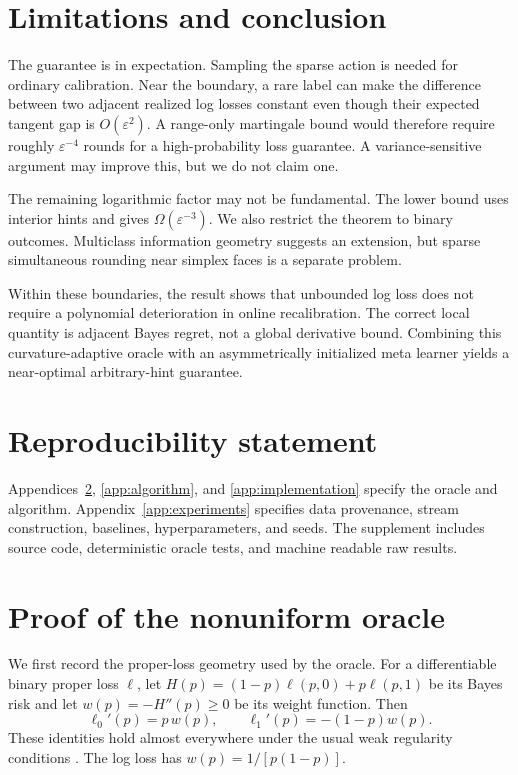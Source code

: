 \documentclass{article}
\begin{document}
\section{Limitations and conclusion}
\label{sec:conclusion}

The guarantee is in expectation. Sampling the sparse action is needed for ordinary calibration. Near the boundary, a rare label can make the difference between two adjacent realized log losses constant even though their expected tangent gap is $O(\varepsilon^2)$. A range-only martingale bound would therefore require roughly $\varepsilon^{-4}$ rounds for a high-probability loss guarantee. A variance-sensitive argument may improve this, but we do not claim one.

The remaining logarithmic factor may not be fundamental. The lower bound uses interior hints and gives $\Omega(\varepsilon^{-3})$. We also restrict the theorem to binary outcomes. Multiclass information geometry suggests an extension, but sparse simultaneous rounding near simplex faces is a separate problem.

Within these boundaries, the result shows that unbounded log loss does not require a polynomial deterioration in online recalibration. The correct local quantity is adjacent Bayes regret, not a global derivative bound. Combining this curvature-adaptive oracle with an asymmetrically initialized meta learner yields a near-optimal arbitrary-hint guarantee.

\section*{Reproducibility statement}

Appendices~\ref{app:oracle-proof}, \ref{app:algorithm}, and \ref{app:implementation} specify the oracle and algorithm. Appendix~\ref{app:experiments} specifies data provenance, stream construction, baselines, hyperparameters, and seeds. The supplement includes source code, deterministic oracle tests, and machine readable raw results.




\appendix

\section{Proof of the nonuniform oracle}
\label{app:oracle-proof}

We first record the proper-loss geometry used by the oracle. For a differentiable binary proper loss $\ell$, let $H(p)=(1-p)\ell(p,0)+p\ell(p,1)$ be its Bayes risk and let $w(p)=-H''(p)\geq0$ be its weight function. Then
\begin{equation}
 \ell_0'(p)=p\,w(p),\qquad
 \ell_1'(p)=-(1-p)w(p).
 \label{eq:proper-derivatives}
\end{equation}
These identities hold almost everywhere under the usual weak regularity conditions \citep{reid2010composite}. The log loss has $w(p)=1/[p(1-p)]$.
\end{document}
